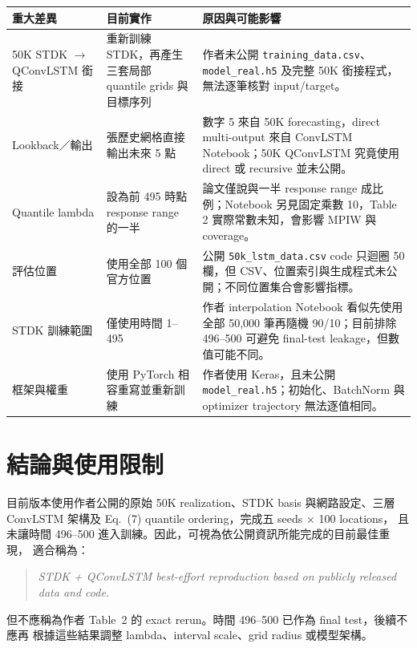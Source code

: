 \documentclass[12pt,a4paper]{article}
\begin{document}
\small
\begin{longtable}{>{\raggedright\arraybackslash}p{}
                  >{\raggedright\arraybackslash}p{}
                  >{\raggedright\arraybackslash}p{}}
\toprule
重大差異 & 目前實作 & 原因與可能影響 \\
\midrule
\endhead
50K STDK $\rightarrow$ QConvLSTM 銜接 & 重新訓練 STDK，再產生三套局部 quantile grids 與目標序列 & 作者未公開 \texttt{training\_data.csv}、\texttt{model\_real.h5} 及完整 50K 銜接程式，無法逐筆核對 input/target。 \\
Lookback／輸出 & 5 張歷史網格直接輸出未來 5 點 & 數字 5 來自 50K forecasting，direct multi-output 來自 ConvLSTM Notebook；50K QConvLSTM 究竟使用 direct 或 recursive 並未公開。 \\
Quantile lambda & 設為前 495 時點 response range 的一半 & 論文僅說與一半 response range 成比例；Notebook 另見固定乘數 10，Table 2 實際常數未知，會影響 MPIW 與 coverage。 \\
評估位置 & 使用全部 100 個官方位置 & 公開 \texttt{50k\_lstm\_data.csv} code 只迴圈 50 欄，但 CSV、位置索引與生成程式未公開；不同位置集合會影響指標。 \\
STDK 訓練範圍 & 僅使用時間 1--495 & 作者 interpolation Notebook 看似先使用全部 50,000 筆再隨機 90/10；目前排除 496--500 可避免 final-test leakage，但數值可能不同。 \\
框架與權重 & 使用 PyTorch 相容重寫並重新訓練 & 作者使用 Keras，且未公開 \texttt{model\_real.h5}；初始化、BatchNorm 與 optimizer trajectory 無法逐值相同。 \\
\bottomrule
\end{longtable}
\normalsize

\section{結論與使用限制}

目前版本使用作者公開的原始 50K realization、STDK basis 與網路設定、三層
ConvLSTM 架構及 Eq.~(7) quantile ordering，完成五 seeds $\times$ 100 locations，
且未讓時間 496--500 進入訓練。因此，可視為依公開資訊所能完成的目前最佳重現，
適合稱為：

\begin{quote}
\textit{STDK + QConvLSTM best-effort reproduction based on publicly released data and code.}
\end{quote}

但不應稱為作者 Table~2 的 exact rerun。時間 496--500 已作為 final test，後續不應再
根據這些結果調整 lambda、interval scale、grid radius 或模型架構。
\end{document}

